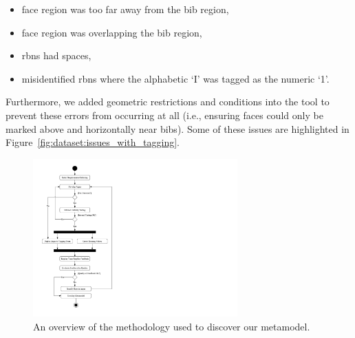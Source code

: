 \begin{itemize}
  \item face region was too far away from the bib region,
  \item face region was overlapping the bib region,
  \item \glspl{rbn} had spaces,
  \item misidentified \glspl{rbn} where the alphabetic `I' was tagged as the numeric `1'.
\end{itemize}

\noindent
Furthermore, we added geometric restrictions and conditions into the tool to prevent these errors from occurring at all (i.e., ensuring faces could only be marked above and horizontally near bibs). Some of these issues are highlighted in Figure~\ref{fig:dataset:issues_with_tagging}.

\begin{figure}[p]
  \centering
  \includegraphics[width=0.7\textwidth]{images/dataset/methodology}
  \caption[Implementation methodology]{An overview of the methodology used to discover our metamodel.}
  \label{fig:dataset:methodology}
\end{figure}

